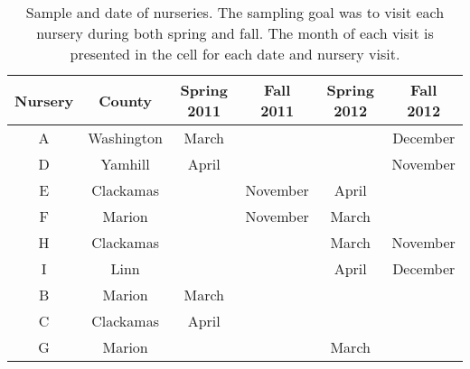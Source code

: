 \documentclass[12pt]{article}
\begin{document}
\begin{table}[!ht]
\caption{Sample and date of nurseries.  The sampling goal was to visit each nursery during both spring and fall.  The month of each visit is presented in the cell for each date and nursery visit.}
\begin{tabular}{cccccc}
\hline
\textbf{Nursery} & \textbf{County} & \textbf{Spring 2011} & \textbf{Fall 2011} & \textbf{Spring 2012} & \textbf{Fall 2012} \\
\hline
A & Washington & March & & & December \\
D & Yamhill & April & & & November \\
E & Clackamas & & November & April & \\
F & Marion & & November & March & \\
H & Clackamas & & & March & November \\
I & Linn & & & April & December \\
B & Marion & March & & & \\
C & Clackamas & April & & & \\
G & Marion & &  & March & \\
\hline
\end{tabular}
\label{tab:sample}
\end{table}
\end{document}
